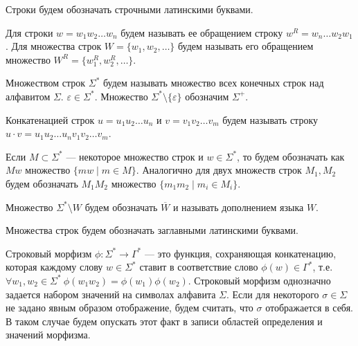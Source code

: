 Строки будем обозначать строчными латинскими буквами.

\begin{Definition}
Для строки $w = w_1 w_2 \ldots w_n$ будем называть ее обращением строку $w^R = w_n \ldots w_2 w_1$.
Для множества строк $W = \{w_1, w_2, \dots\}$ будем называть его обращением множество $W^R = \{w_1^R, w_2^R, \dots\}$.
\end{Definition}

\begin{Definition}
  Множеством строк $\Sigma^*$ будем называть множество всех конечных строк над алфавитом $\Sigma$.
  $\varepsilon \in \Sigma^*$. Множество $\Sigma^* \setminus \{\varepsilon\}$ обозначим $\Sigma^+$.
\end{Definition}

\begin{Definition}
  Конкатенацией строк $u = u_1 u_2 \ldots u_n$ и $v = v_1 v_2 \ldots v_m$ будем называть 
  строку $u \cdot v = u_1 u_2 \ldots u_n v_1 v_2 \ldots v_m$.

  Если $M \subset \Sigma^*$ --- некоторое множество строк и $w \in \Sigma^*$, 
  то будем обозначать как $Mw$ множество $\{mw \mid  m \in M\}$.
  Аналогично для двух множеств строк $M_1, M_2$ будем обозначать $M_1 M_2$ множество 
  $\{m_1 m_2 \mid m_i \in M_i\}$.
\end{Definition}

\begin{Definition}
  Множество $\Sigma^* \setminus W$ будем обозначать $\overline{W}$ и называть дополнением языка $W$.
\end{Definition}

Множества строк будем обозначать заглавными латинскими буквами.

\begin{Definition}
  Строковый морфизм $\phi\!: \Sigma^* \to \Gamma^*$ --- это функция, сохраняющая конкатенацию, которая каждому слову $w \in \Sigma^*$ 
  ставит в соответствие слово $\phi(w) \in \Gamma^*$, т.е. $\forall w_1, w_2 \in \Sigma^* \ \phi(w_1 w_2) = \phi(w_1) \phi(w_2)$. Строковый морфизм однозначно задается набором значений на символах алфавита $\Sigma$. Если для некоторого $\sigma \in \Sigma$ не задано явным образом отображение, будем считать, что $\sigma$ отображается в себя. В таком случае будем опускать этот факт в записи областей определения и значений морфизма.
\end{Definition}

